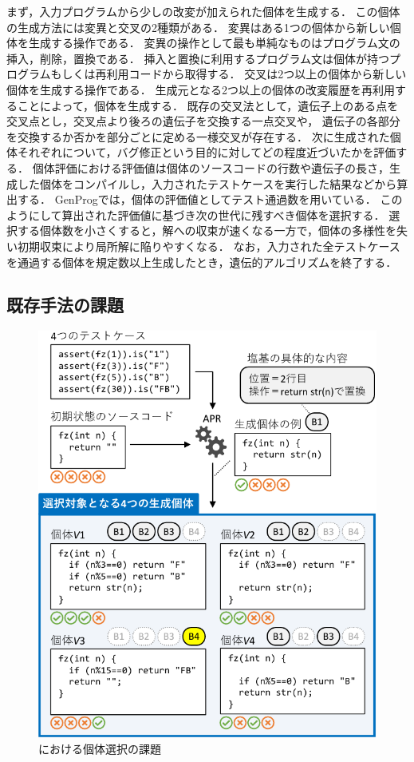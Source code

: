 \documentclass[uplatex,dvipdfmx,a4paper]{jsarticle}
\let\oldcite\cite
\renewcommand{\cite}[1]{\xspace\oldcite{#1}}
\begin{document}
まず，入力プログラムから少しの改変が加えられた個体を生成する．
この個体の生成方法には変異と交叉の2種類がある．
変異はある1つの個体から新しい個体を生成する操作である．
変異の操作として最も単純なものはプログラム文の挿入，削除，置換である．
挿入と置換に利用するプログラム文は個体が持つプログラムもしくは再利用コードから取得する．
交叉は2つ以上の個体から新しい個体を生成する操作である．
生成元となる2つ以上の個体の改変履歴を再利用することによって，個体を生成する．
既存の交叉法として，遺伝子上のある点を交叉点とし，交叉点より後ろの遺伝子を交換する一点交叉や，
遺伝子の各部分を交換するか否かを部分ごとに定める一様交叉が存在する\cite{ahvanooey2019survey}．
次に生成された個体それぞれについて，バグ修正という目的に対してどの程度近づいたかを評価する．
個体評価における評価値は個体のソースコードの行数や遺伝子の長さ，生成した個体をコンパイルし，入力されたテストケースを実行した結果などから算出する．
GenProgでは，個体の評価値としてテスト通過数を用いている．
このようにして算出された評価値に基づき次の世代に残すべき個体を選択する．
選択する個体数を小さくすると，解への収束が速くなる一方で，個体の多様性を失い初期収束により局所解に陥りやすくなる．
なお，入力された全テストケースを通過する個体を規定数以上生成したとき，遺伝的アルゴリズムを終了する．

\subsection{既存手法の課題} \label{sec:prev_challenge}

\begin{figure}[p]
  \centering
  \includegraphics[width=\linewidth]{fig/concept.pdf}
  \caption{\apr における個体選択の課題}
  \label{fig:problem}
\end{figure}
\end{document}
